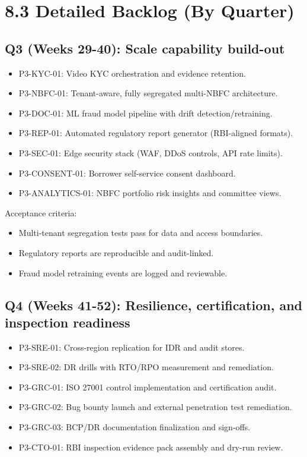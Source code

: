 ﻿\documentclass[12pt]{article}
\begin{document}
\section{8.3 Detailed Backlog (By Quarter)}


\subsection{Q3 (Weeks 29-40): Scale capability build-out}


\begin{itemize}
\item P3-KYC-01: Video KYC orchestration and evidence retention.
\item P3-NBFC-01: Tenant-aware, fully segregated multi-NBFC architecture.
\item P3-DOC-01: ML fraud model pipeline with drift detection/retraining.
\item P3-REP-01: Automated regulatory report generator (RBI-aligned formats).
\item P3-SEC-01: Edge security stack (WAF, DDoS controls, API rate limits).
\item P3-CONSENT-01: Borrower self-service consent dashboard.
\item P3-ANALYTICS-01: NBFC portfolio risk insights and committee views.
\end{itemize}

Acceptance criteria:

\begin{itemize}
\item Multi-tenant segregation tests pass for data and access boundaries.
\item Regulatory reports are reproducible and audit-linked.
\item Fraud model retraining events are logged and reviewable.
\end{itemize}

\subsection{Q4 (Weeks 41-52): Resilience, certification, and inspection readiness}


\begin{itemize}
\item P3-SRE-01: Cross-region replication for IDR and audit stores.
\item P3-SRE-02: DR drills with RTO/RPO measurement and remediation.
\item P3-GRC-01: ISO 27001 control implementation and certification audit.
\item P3-GRC-02: Bug bounty launch and external penetration test remediation.
\item P3-GRC-03: BCP/DR documentation finalization and sign-offs.
\item P3-CTO-01: RBI inspection evidence pack assembly and dry-run review.
\end{itemize}
\end{document}
